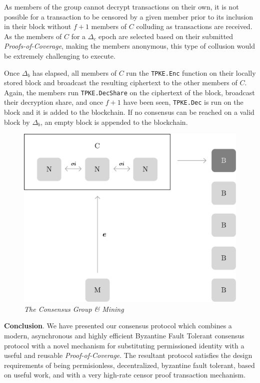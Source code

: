 \documentclass[10pt, nonatbib, nocopyrightspace, reprint]{sigplanconf}
\begin{document}
As members of the group cannot decrypt transactions on their own, it is not possible for a transaction to be censored by a given member prior to its inclusion in their block without $f + 1$ members of $C$ colluding as transactions are received. As the members of $C$ for a $\Delta_c$ epoch are selected based on their submitted \emph{Proofs-of-Coverage}, making the members anonymous, this type of collusion would be extremely challenging to execute.

Once $\Delta_b$ has elapsed, all members of $C$ run the \verb|TPKE.Enc| function on their locally stored block and broadcast the resulting ciphertext to the other members of $C$. Again, the members run \verb|TPKE.DecShare| on the ciphertext of the block, broadcast their decryption share, and once $f + 1$ have been seen, \verb|TPKE.Dec| is run on the block and it is added to the blockchain. If no consensus can be reached on a valid block by $\Delta_b$, an empty block is appended to the blockchain.

\begin{figure}[ht]
    \begin{center}
          \includegraphics[width=\columnwidth]{consensus_group.eps}
          \caption{\emph{The Consensus Group \& Mining}}
          \label{fig:consensus-group}
     \end{center}
\end{figure}

\textbf{Conclusion}. We have presented our consensus protocol which combines a modern, asynchronous and highly efficient Byzantine Fault Tolerant consensus protocol with a novel mechanism for substituting permissioned identity with a useful and reusable \emph{Proof-of-Coverage}. The resultant protocol satisfies the design requirements of being permisionless, decentralized, byzantine fault tolerant, based on useful work, and with a very high-rate censor proof transaction mechanism.
\end{document}

